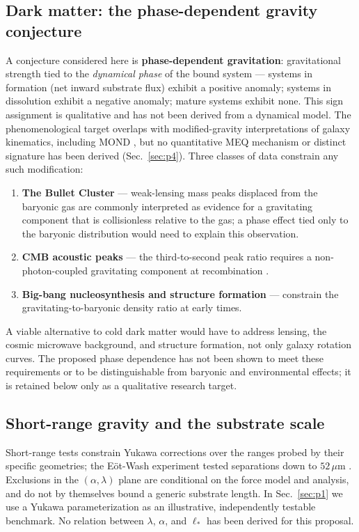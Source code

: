\documentclass[11pt,a4paper]{article}
\newcommand{\meq}{MEQ}
\begin{document}
\subsection{Dark matter: the phase-dependent gravity conjecture}\label{sec:dm}

A conjecture considered here is \textbf{phase-dependent gravitation}:
gravitational strength tied to the \emph{dynamical phase} of the bound system --- systems in
formation (net inward substrate flux) exhibit a positive anomaly; systems in dissolution exhibit a
negative anomaly; mature systems exhibit none. This sign assignment is qualitative and has not
been derived from a dynamical model. The phenomenological target overlaps with modified-gravity
interpretations of galaxy kinematics, including MOND \cite{McGaugh2016}, but no quantitative
\meq{} mechanism or distinct signature has been derived (Sec.~\ref{sec:p4}). Three classes of
data constrain any such modification:
\begin{enumerate}
\item \textbf{The Bullet Cluster} --- weak-lensing mass peaks displaced from the baryonic gas
\cite{Clowe2006} are commonly interpreted as evidence for a gravitating component that is
collisionless relative to the gas; a phase effect tied only to the baryonic distribution would
need to explain this observation.
\item \textbf{CMB acoustic peaks} --- the third-to-second peak ratio requires a
non-photon-coupled gravitating component at recombination \cite{Planck2020}.
\item \textbf{Big-bang nucleosynthesis and structure formation} --- constrain the
gravitating-to-baryonic density ratio at early times.
\end{enumerate}
A viable alternative to cold dark matter would have to address lensing, the cosmic microwave
background, and structure formation, not only galaxy rotation curves. The proposed phase
dependence has not been shown to meet these requirements or to be distinguishable from baryonic
and environmental effects; it is retained below only as a qualitative research target.

\subsection{Short-range gravity and the substrate scale}\label{sec:shortrange}

Short-range tests constrain Yukawa corrections over the ranges probed by their specific
geometries; the E\"ot-Wash experiment tested separations down to $52\,\mu$m
\cite{Lee2020}. Exclusions in the $(\alpha,\lambda)$ plane are conditional on the force model and
analysis, and do not by themselves bound a generic substrate length. In Sec.~\ref{sec:p1} we use
a Yukawa parameterization as an illustrative, independently testable benchmark. No relation
between $\lambda$, $\alpha$, and $\ell_\ast$ has been derived for this proposal.
\end{document}
